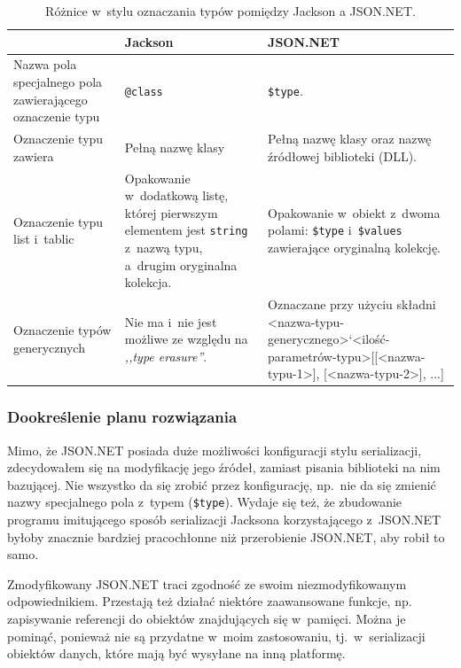 \begin{table}[htbp]              
	\centering
		\begin{tabular}{ | p{} || p{} | p{} | }
			\hline
				& \textbf{Jackson} & \textbf{JSON.NET} \\
				\hline \hline
				Nazwa pola specjalnego pola zawierającego oznaczenie typu & \texttt{@class} & \texttt{\$type}. \\
				\hline
				Oznaczenie typu zawiera & Pełną nazwę klasy & Pełną nazwę klasy oraz nazwę źródłowej biblioteki (DLL). \\
				\hline
				Oznaczenie typu list i~tablic & Opakowanie w~dodatkową listę, której pierwszym elementem jest \texttt{string} z~nazwą typu, a~drugim oryginalna kolekcja. & Opakowanie w~obiekt z~dwoma polami: \texttt{\$type} i~\texttt{\$values} zawierające oryginalną kolekcję. \\
				\hline
				Oznaczenie typów generycznych & Nie ma i~nie jest możliwe ze względu na \emph{,,type erasure''}. & Oznaczane przy użyciu składni <nazwa-typu-generycznego>`<ilość-parametrów-typu>[[<nazwa-typu-1>], [<nazwa-typu-2>], ...] \\
				\hline
		\end{tabular}
	\caption{Różnice w~stylu oznaczania typów pomiędzy Jackson a JSON.NET.}
	\label{tab:jackson-jsonnet-differences}
\end{table}

\subsubsection{Dookreślenie planu rozwiązania}
Mimo, że JSON.NET posiada duże możliwości konfiguracji stylu serializacji, zdecydowałem się na modyfikację jego źródeł, zamiast pisania biblioteki na nim bazującej. Nie wszystko da się zrobić przez konfigurację, np.\ nie da się zmienić nazwy specjalnego pola z~typem (\texttt{\$type}).
Wydaje się też, że zbudowanie programu imitującego sposób serializacji Jacksona korzystającego z~JSON.NET byłoby znacznie bardziej pracochłonne niż przerobienie JSON.NET, aby robił to samo.

Zmodyfikowany JSON.NET traci zgodność ze swoim niezmodyfikowanym odpowiednikiem.
Przestają też działać niektóre zaawansowane funkcje, np. zapisywanie referencji do obiektów znajdujących się w~pamięci.
Można je pominąć, ponieważ nie są przydatne w~moim zastosowaniu, tj.\ w~serializacji obiektów danych, które mają być wysyłane na inną platformę.

